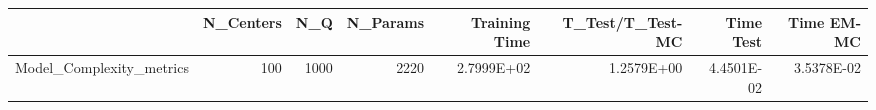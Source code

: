 \begin{tabular}{lrrrrrrr}
\toprule
{} &  N\_Centers &   N\_Q &  N\_Params &  Training Time &  T\_Test/T\_Test-MC &  Time Test &  Time EM-MC \\
\midrule
Model\_Complexity\_metrics &        100 &  1000 &      2220 &     2.7999E+02 &        1.2579E+00 & 4.4501E-02 &  3.5378E-02 \\
\bottomrule
\end{tabular}
